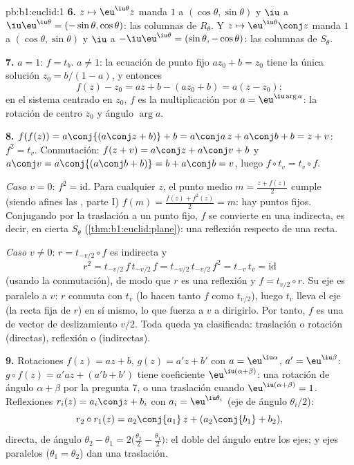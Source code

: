 \begin{solution}{pb:b1:euclid:1}
\textbf{6.} $z \mapsto \eu^{\iu\theta}z$ manda $1$ a
$(\cos\theta, \sin\theta)$ y $\iu$ a
$\iu\eu^{\iu\theta} = (-\sin\theta, \cos\theta)$: las columnas de
$R_\theta$. Y $z \mapsto \eu^{\iu\theta}\conj z$ manda $1$ a
$(\cos\theta, \sin\theta)$ y $\iu$ a
$-\iu\eu^{\iu\theta} = (\sin\theta, -\cos\theta)$: las columnas de
$S_\theta$.

\textbf{7.} $a = 1$: $f = t_b$. $a \neq 1$: la ecuación de punto fijo
$az_0 + b = z_0$ tiene la única solución $z_0 = b/(1 - a)$, y
entonces
\[
f(z) - z_0 = az + b - (az_0 + b) = a(z - z_0):
\]
en el sistema centrado en $z_0$, $f$ es la multiplicación por
$a = \eu^{\iu\arg a}$: la rotación de centro $z_0$ y ángulo
$\arg a$.

\textbf{8.} $f(f(z)) = a\conj{(a\conj z + b)} + b = a\conj a\,z
+ a\conj b + b = z + v$: $f^2 = t_v$. Conmutación:
$f(z + v) = a\conj z + a\conj v + b$ y
$a\conj v = a\conj{(a\conj b + b)} = b + a\conj b = v$, luego
$f\circ t_v = t_v\circ f$.

\emph{Caso $v = 0$}: $f^2 = \mathrm{id}$. Para cualquier $z$, el
punto medio $m = \frac{z + f(z)}2$ cumple (siendo afines las
, parte I) $f(m) = \frac{f(z) + f^2(z)}{2} = m$: hay puntos
fijos. Conjugando por la traslación a un punto fijo, $f$ se convierte
en una   indirecta, es decir, en cierta $S_\theta$
(\cref{thm:b1:euclid:plane}): una reflexión respecto de una recta.

\emph{Caso $v \neq 0$}: $r = t_{-v/2}\circ f$ es indirecta y
\[
r^2 = t_{-v/2}\,f\,t_{-v/2}\,f = t_{-v/2}\,t_{-v/2}\,f^2
= t_{-v}\,t_v = \mathrm{id}
\]
(usando la conmutación), de modo que $r$ es una reflexión y
$f = t_{v/2}\circ r$. Su eje es paralelo a $v$: $r$ conmuta con $t_v$
(lo hacen tanto $f$ como $t_{v/2}$), luego $t_v$ lleva el eje (la
recta fija de $r$) en sí mismo, lo que fuerza a $v$ a dirigirlo. Por
tanto, $f$ es una  de vector de deslizamiento
$v/2$. Toda  queda ya clasificada: traslación o rotación
(directas), reflexión o  (indirectas).

\textbf{9.} Rotaciones $f(z) = az + b$, $g(z) = a'z + b'$ con
$a = \eu^{\iu\alpha}$, $a' = \eu^{\iu\beta}$:
$g\circ f(z) = a'az + (a'b + b')$ tiene coeficiente 
$\eu^{\iu(\alpha+\beta)}$: una rotación de ángulo $\alpha + \beta$
por la pregunta 7, o una traslación cuando
$\eu^{\iu(\alpha+\beta)} = 1$. Reflexiones $r_i(z) = a_i\conj z +
b_i$ con $a_i = \eu^{\iu\theta_i}$ (eje de ángulo $\theta_i/2$):
\[
r_2\circ r_1(z) = a_2\conj{a_1}\,z + (a_2\conj{b_1} + b_2),
\]
directa, de ángulo
$\theta_2 - \theta_1 = 2\bigl(\tfrac{\theta_2}2 -
\tfrac{\theta_1}2\bigr)$: el doble del ángulo entre los ejes; y ejes
paralelos ($\theta_1 = \theta_2$) dan una traslación.


\end{solution}
